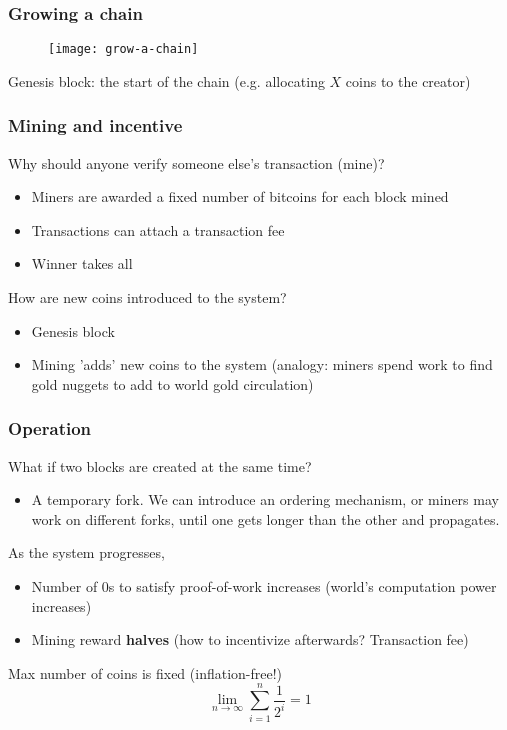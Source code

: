 \documentclass{beamer}
\begin{document}
\begin{frame}
\frametitle{Growing a chain}

\begin{figure}
  \centering
  \texttt{[image: grow-a-chain]}
\end{figure}

Genesis block: the start of the chain (e.g. allocating $X$ coins to the creator)

\end{frame}

\begin{frame}
\frametitle{Mining and incentive}

\vspace{0.2in}
Why should anyone verify someone else's transaction (mine)?
\begin{itemize}
  \item Miners are awarded a fixed number of bitcoins for each block mined
  \item Transactions can attach a transaction fee
  \item Winner takes all
\end{itemize}

\vspace{0.2in}
How are new coins introduced to the system?
\begin{itemize}
  \item Genesis block
  \item Mining 'adds' new coins to the system (analogy: miners spend work to find gold nuggets to add to world gold circulation)
\end{itemize}

\end{frame}

\begin{frame}
\frametitle{Operation}

What if two blocks are created at the same time?
\begin{itemize}
  \item A temporary fork. We can introduce an ordering mechanism, or miners may work on different forks, until one gets longer than the other and propagates.
\end{itemize}

\vspace{0.2in}
As the system progresses,
\begin{itemize}
  \item Number of $0$s to satisfy proof-of-work increases (world's computation power increases)
  \item Mining reward \textbf{halves} (how to incentivize afterwards? Transaction fee)
\end{itemize}

\vspace{0.2in}
Max number of coins is fixed (inflation-free!)
$$
\lim\limits_{n \to \infty}{\sum_{i = 1}^{n}{\frac{1}{2^i}}} = 1
$$

\end{frame}
\end{document}
